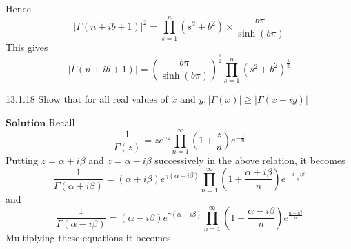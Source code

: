 Hence 
$$|\Gamma(n+i b+1)|^{2}=\prod_{s=1}^{n}\left(s^{2}+b^{2}\right) \times \frac{b \pi}{\sinh (b \pi)}$$
This gives 
$$|\Gamma(n+i b+1)|=\left(\frac{b \pi}{\sinh (b \pi)}\right)^{\frac{1}{2}} \prod_{s=1}^{n}\left(s^{2}+b^{2}\right)^{\frac{1}{2}} $$

\newpage


\begin{mybox}{13.1.18}
Show that for all real values of $x$ and $y,|\Gamma(x)| \geq|\Gamma(x+i y)|$
\end{mybox}


$\boxed{\textbf{Solution}}$ Recall 
$$
\frac{1}{\Gamma(z)}=z e^{\gamma z} \prod_{n=1}^{\infty}\left(1+\frac{z}{n}\right) e^{-\frac{z}{n}}
$$
Putting $z=\alpha+i \beta$ and $z=\alpha-i \beta$ successively in the above relation, it becomes
$$
\frac{1}{\Gamma(\alpha+i \beta)}=(\alpha+i \beta) e^{\gamma(\alpha+i \beta)} \prod_{n=1}^{\infty}\left(1+\frac{\alpha+i \beta}{n}\right) e^{-\frac{a+i \beta}{n}}
$$
and 
$$
\frac{1}{\Gamma(\alpha-i \beta)}=(\alpha-i \beta) e^{\gamma(\alpha-i \beta)} \prod_{n=1}^{\infty}\left(1+\frac{\alpha-i \beta}{n}\right) e^{\frac{a-i \beta}{n}}
$$
Multiplying these equations it becomes
